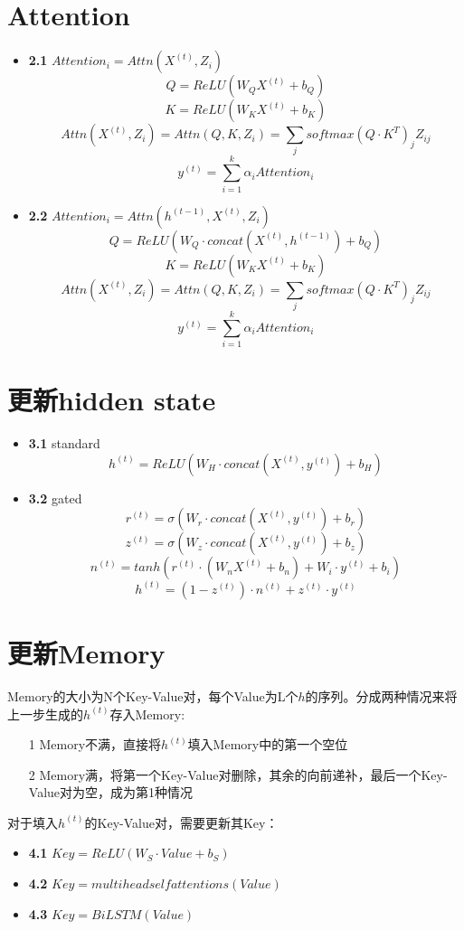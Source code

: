 \documentclass{article}
\begin{document}
\section{Attention}
	\begin{itemize}
		\item \textbf{2.1} $Attention_i = Attn(X^{(t)}, Z_i)$
			$$Q = ReLU(W_QX^{(t)} + b_Q)$$
			$$K = ReLU(W_KX^{(t)} + b_K)$$
			$$Attn(X^{(t)}, Z_i) = Attn(Q, K, Z_i)  = \sum_j softmax(Q\cdot K^T)_jZ_{ij}$$
			$$y^{(t)} = \sum_{i=1}^k \alpha_i Attention_i$$
		\item \textbf{2.2} $Attention_i = Attn(h^{(t-1)},X^{(t)}, Z_i)$
			$$Q = ReLU(W_Q\cdot concat(X^{(t)}, h^{(t-1)}) + b_Q)$$
			$$K = ReLU(W_KX^{(t)} + b_K)$$
			$$Attn(X^{(t)}, Z_i) = Attn(Q, K, Z_i)  = \sum_j softmax(Q\cdot K^T)_jZ_{ij}$$
			$$y^{(t)} = \sum_{i=1}^k \alpha_i Attention_i$$
	\end{itemize}
\section{更新hidden state}
	\begin{itemize}
		\item \textbf{3.1} standard
			$$h^{(t)} = ReLU(W_H\cdot concat(X^{(t)}, y^{(t)}) + b_H)$$
		\item \textbf{3.2} gated
			$$ r^{(t)} = \sigma(W_r \cdot concat(X^{(t)}, y^{(t)}) + b_r) $$
			$$ z^{(t)} = \sigma(W_z \cdot concat(X^{(t)}, y^{(t)}) + b_z) $$
			$$ n^{(t)} = tanh(r^{(t)} \cdot (W_nX^{(t)} + b_n) + W_i \cdot y^{(t)} + b_i) $$
			$$ h^{(t)} = (1 - z^{(t)})\cdot n^{(t)} + z^{(t)} \cdot y^{(t)}$$
	\end{itemize}
\section{更新Memory}
	Memory的大小为N个Key-Value对，每个Value为L个$h$的序列。分成两种情况来将上一步生成的$h^{(t)}$存入Memory:
	\begin{itemize}
		\item[1] Memory不满，直接将$h^{(t)}$填入Memory中的第一个空位
		\item[2] Memory满，将第一个Key-Value对删除，其余的向前递补，最后一个Key-Value对为空，成为第1种情况
	\end{itemize}
	对于填入$h^{(t)}$的Key-Value对，需要更新其Key：
	\begin{itemize}
		\item \textbf{4.1} $Key = ReLU(W_S\cdot Value + b_S)$
		\item \textbf{4.2} $Key = multiheadselfattentions(Value)$
		\item \textbf{4.3} $Key = BiLSTM(Value)$
	\end{itemize}


\end{document}
